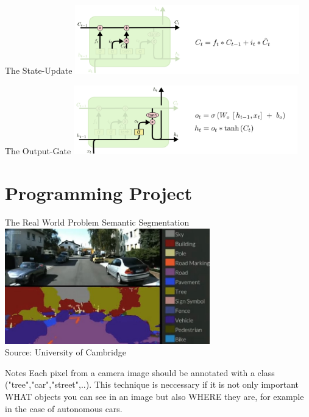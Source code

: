 \begin{frame}{The State-Update}
\includegraphics[height=3.0cm]{data/LSTM3-focus-C.png}\\ 
\end{frame}

\begin{frame}{The Output-Gate}
\includegraphics[height=3.0cm]{data/LSTM3-focus-o.png}\\ 
\end{frame}

\section{Programming Project}
\begin{frame}
\sectionpage
\end{frame}

\begin{frame}{The Real World Problem}
Semantic Segmentation\\
\includegraphics[height=5.0cm]{data/segnet.jpg}\\ 
Source: University of Cambridge\\
\end{frame}

\begin{frame}[beamer:0]{Notes}
Each pixel from a camera image should be annotated with a class ("tree","car","street",..). This technique is neccessary if it is not only important WHAT objects you can see in an image but also WHERE they are, for example in the case of autonomous cars.
\end{frame}

